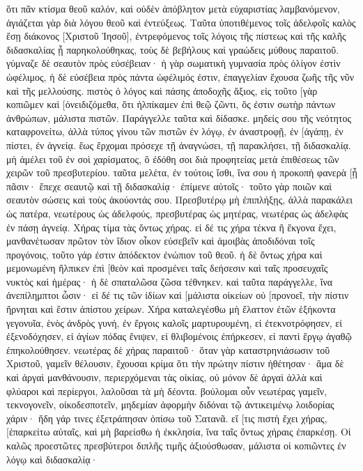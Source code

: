 ὅτι πᾶν κτίσμα θεοῦ καλόν, καὶ οὐδὲν ἀπόβλητον μετὰ εὐχαριστίας λαμβανόμενον, 
ἁγιάζεται γὰρ διὰ λόγου θεοῦ καὶ ἐντεύξεως. 
Ταῦτα ὑποτιθέμενος τοῖς ἀδελφοῖς καλὸς ἔσῃ διάκονος [Χριστοῦ Ἰησοῦ], ἐντρεφόμενος τοῖς λόγοις τῆς πίστεως καὶ τῆς καλῆς διδασκαλίας ᾗ παρηκολούθηκας, 
τοὺς δὲ βεβήλους καὶ γραώδεις μύθους παραιτοῦ. γύμναζε δὲ σεαυτὸν πρὸς εὐσέβειαν· 
ἡ γὰρ σωματικὴ γυμνασία πρὸς ὀλίγον ἐστὶν ὠφέλιμος, ἡ δὲ εὐσέβεια πρὸς πάντα ὠφέλιμός ἐστιν, ἐπαγγελίαν ἔχουσα ζωῆς τῆς νῦν καὶ τῆς μελλούσης. 
πιστὸς ὁ λόγος καὶ πάσης ἀποδοχῆς ἄξιος, 
εἰς τοῦτο [γὰρ κοπιῶμεν καὶ [ὀνειδιζόμεθα, ὅτι ἠλπίκαμεν ἐπὶ θεῷ ζῶντι, ὅς ἐστιν σωτὴρ πάντων ἀνθρώπων, μάλιστα πιστῶν. 
Παράγγελλε ταῦτα καὶ δίδασκε. 
μηδείς σου τῆς νεότητος καταφρονείτω, ἀλλὰ τύπος γίνου τῶν πιστῶν ἐν λόγῳ, ἐν ἀναστροφῇ, ἐν [ἀγάπῃ, ἐν πίστει, ἐν ἁγνείᾳ. 
ἕως ἔρχομαι πρόσεχε τῇ ἀναγνώσει, τῇ παρακλήσει, τῇ διδασκαλίᾳ. 
μὴ ἀμέλει τοῦ ἐν σοὶ χαρίσματος, ὃ ἐδόθη σοι διὰ προφητείας μετὰ ἐπιθέσεως τῶν χειρῶν τοῦ πρεσβυτερίου. 
ταῦτα μελέτα, ἐν τούτοις ἴσθι, ἵνα σου ἡ προκοπὴ φανερὰ [ᾖ πᾶσιν· 
ἔπεχε σεαυτῷ καὶ τῇ διδασκαλίᾳ· ἐπίμενε αὐτοῖς· τοῦτο γὰρ ποιῶν καὶ σεαυτὸν σώσεις καὶ τοὺς ἀκούοντάς σου. 
Πρεσβυτέρῳ μὴ ἐπιπλήξῃς, ἀλλὰ παρακάλει ὡς πατέρα, νεωτέρους ὡς ἀδελφούς, 
πρεσβυτέρας ὡς μητέρας, νεωτέρας ὡς ἀδελφὰς ἐν πάσῃ ἁγνείᾳ. 
Χήρας τίμα τὰς ὄντως χήρας. 
εἰ δέ τις χήρα τέκνα ἢ ἔκγονα ἔχει, μανθανέτωσαν πρῶτον τὸν ἴδιον οἶκον εὐσεβεῖν καὶ ἀμοιβὰς ἀποδιδόναι τοῖς προγόνοις, τοῦτο γάρ ἐστιν ἀπόδεκτον ἐνώπιον τοῦ θεοῦ. 
ἡ δὲ ὄντως χήρα καὶ μεμονωμένη ἤλπικεν ἐπὶ [θεὸν καὶ προσμένει ταῖς δεήσεσιν καὶ ταῖς προσευχαῖς νυκτὸς καὶ ἡμέρας· 
ἡ δὲ σπαταλῶσα ζῶσα τέθνηκεν. 
καὶ ταῦτα παράγγελλε, ἵνα ἀνεπίλημπτοι ὦσιν· 
εἰ δέ τις τῶν ἰδίων καὶ [μάλιστα οἰκείων οὐ [προνοεῖ, τὴν πίστιν ἤρνηται καὶ ἔστιν ἀπίστου χείρων. 
Χήρα καταλεγέσθω μὴ ἔλαττον ἐτῶν ἑξήκοντα γεγονυῖα, ἑνὸς ἀνδρὸς γυνή, 
ἐν ἔργοις καλοῖς μαρτυρουμένη, εἰ ἐτεκνοτρόφησεν, εἰ ἐξενοδόχησεν, εἰ ἁγίων πόδας ἔνιψεν, εἰ θλιβομένοις ἐπήρκεσεν, εἰ παντὶ ἔργῳ ἀγαθῷ ἐπηκολούθησεν. 
νεωτέρας δὲ χήρας παραιτοῦ· ὅταν γὰρ καταστρηνιάσωσιν τοῦ Χριστοῦ, γαμεῖν θέλουσιν, 
ἔχουσαι κρίμα ὅτι τὴν πρώτην πίστιν ἠθέτησαν· 
ἅμα δὲ καὶ ἀργαὶ μανθάνουσιν, περιερχόμεναι τὰς οἰκίας, οὐ μόνον δὲ ἀργαὶ ἀλλὰ καὶ φλύαροι καὶ περίεργοι, λαλοῦσαι τὰ μὴ δέοντα. 
βούλομαι οὖν νεωτέρας γαμεῖν, τεκνογονεῖν, οἰκοδεσποτεῖν, μηδεμίαν ἀφορμὴν διδόναι τῷ ἀντικειμένῳ λοιδορίας χάριν· 
ἤδη γάρ τινες ἐξετράπησαν ὀπίσω τοῦ Σατανᾶ. 
εἴ [τις πιστὴ ἔχει χήρας, [ἐπαρκείτω αὐταῖς, καὶ μὴ βαρείσθω ἡ ἐκκλησία, ἵνα ταῖς ὄντως χήραις ἐπαρκέσῃ. 
Οἱ καλῶς προεστῶτες πρεσβύτεροι διπλῆς τιμῆς ἀξιούσθωσαν, μάλιστα οἱ κοπιῶντες ἐν λόγῳ καὶ διδασκαλίᾳ· 
